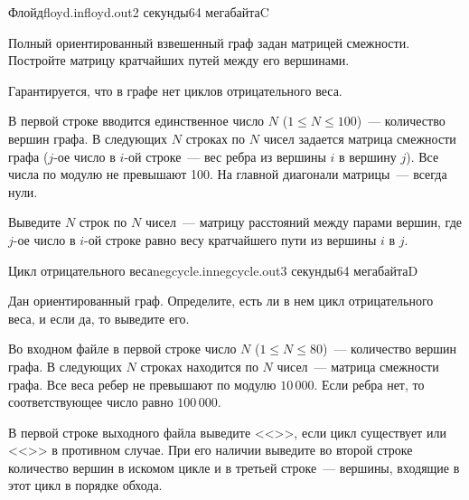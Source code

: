 \documentclass[12pt,a4paper,oneside,twocolumn,landscape]{article}
\renewcommand{\t}[1]{\ifmmode{\mathtt{#1}}\else{\texttt{#1}}\fi}
\begin{document}
\bigskip\bigskip
\begin{problem}{Флойд}{floyd.in}{floyd.out}{2 секунды}{64 мегабайта}{C}



Полный ориентированный взвешенный граф задан матрицей смежности. Постройте матрицу кратчайших путей между его вершинами. 

Гарантируется, что в графе нет циклов отрицательного веса.

\InputFile
В первой строке вводится единственное число $N$ ($1 \leqslant N \leqslant 100$)~--- количество вершин графа. 
В следующих $N$ строках по $N$ чисел задается матрица смежности графа ($j$-ое 
число в $i$-ой строке~--- вес ребра из вершины $i$ в вершину $j$). 
Все числа по модулю не превышают 100. На главной диагонали матрицы~--- всегда нули.

\OutputFile
Выведите $N$ строк по $N$ чисел~--- матрицу расстояний между парами вершин, где
$j$-ое число в $i$-ой строке равно весу кратчайшего пути из вершины $i$ в $j$.



\Example

\begin{example}
%
\end{example}


\end{problem}

\bigskip\bigskip
\begin{problem}{Цикл отрицательного веса}{negcycle.in}{negcycle.out}{3 секунды}{64 мегабайта}{D}



Дан ориентированный граф. Определите, есть ли в нем цикл отрицательного веса, и если да, то выведите его.

\InputFile
Во входном файле в первой строке число $N$ ($1 \leqslant N \leqslant 80$)~--- количество вершин графа.
В следующих $N$ строках находится по $N$ чисел~--- матрица смежности графа. Все веса ребер
не превышают по модулю $10\,000$. Если ребра нет, то соответствующее число равно $100\,000$.

\OutputFile
В первой строке выходного файла выведите <<\t{YES}>>, если цикл существует или <<\t{NO}>>  в противном случае.
При его наличии выведите во второй строке количество вершин в искомом цикле и в третьей строке~--- вершины,
входящие в этот цикл в порядке обхода.


\Example

\begin{example}
%
\end{example}


\end{problem}
\end{document}
